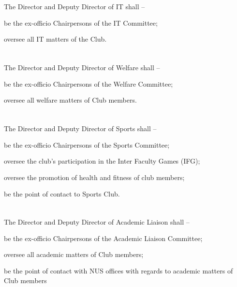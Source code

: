 \section{}
The Director and Deputy Director of IT shall –
	\begin{legal}
	\item be the ex-officio Chairpersons of the IT Committee;
	\item oversee all IT matters of the Club.
	\end{legal}

\section{}
The Director and Deputy Director of Welfare shall –
	\begin{legal}
	\item be the ex-officio Chairpersons of the Welfare Committee;
	\item oversee all welfare matters of Club members.
	\end{legal}

\section{}
The Director and Deputy Director of Sports shall –
	\begin{legal}
	\item be the ex-officio Chairpersons of the Sports Committee;
	\item oversee the club’s participation in the Inter Faculty Games (IFG);
	\item oversee the promotion of health and fitness of club members;
	\item be the point of contact to Sports Club.
	\end{legal}

\section{}
The Director and Deputy Director of Academic Liaison shall –
	\begin{legal}
	\item be the ex-officio Chairpersons of the Academic Liaison Committee;
	\item oversee all academic matters of Club members;
	\item be the point of contact with NUS offices with regards to academic matters of Club members
	\end{legal}
